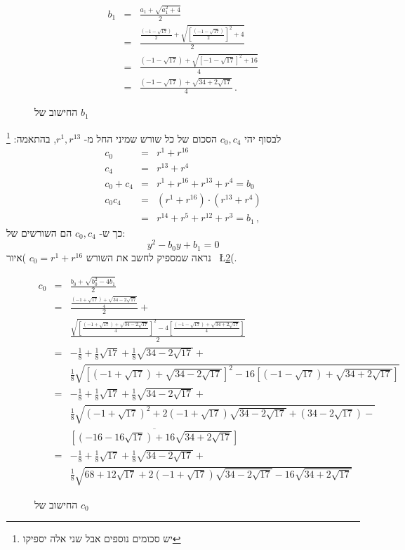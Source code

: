 \documentclass[11pt,a4paper]{article}
\newenvironment{form}[1]{%
\begin{displaymath}%
\renewcommand{\arraystretch}{#1}%
\begin{array}{lcl}}%
{\end{array}%
\end{displaymath}%
}
\newcommand*{\disfrac}[2]{\displaystyle\frac{#1}{#2}}
\begin{document}
\begin{figure}
\begin{form}{2.8}
b_1&=&\disfrac{a_1+\sqrt{a_1^2+4}}{2}\\
&=&\disfrac{
     \disfrac{(-1-\sqrt{17})}{2} + 
     \sqrt{\left[\disfrac{(-1-\sqrt{17})}{2}\right]^2+4}
   }{2}\\
&=&\disfrac{
     (-1-\sqrt{17}) + 
     \sqrt{\left[-1-\sqrt{17}\right]^2+16}
   }{4}\\
&=&\disfrac{
     (-1-\sqrt{17}) + 
     \sqrt{34+2\sqrt{17}}
   }{4}\,.
\end{form}\vspace{-2em}
\caption{החישוב של $b_1$}\label{fig.b1}
\end{figure}
לבסוף יהי
$c_0,c_4$ 
הסכום של כל שורש שמיני החל מ-%
$r^1,r^{13}$,
בהתאמה:%
\footnote{יש סכומים נוספים אבל שני אלה יספיקו}
\begin{form}{1.4}
c_0&=&r^1+r^{16}\\
c_4&=&r^{13}+r^4\\
c_0+c_4&=&r^1+r^{16}+r^{13}+r^4=b_0\\
c_0c_4&=&(r^1+r^{16})\cdot(r^{13}+r^4)\\
&=&r^{14}+r^5+r^{12}+r^3=b_1\,,
\end{form}
כך ש-%
$c_0,c_4$
הם השורשים של:
\[
y^2-b_0y+b_1=0
\]
נראה שמספיק לחשב את השורש
$c_0=r^1+r^{16}$
)איור~
\L{\ref{fig.c0}}(.

\begin{figure}
\begin{form}{2.8}
c_0&=&\disfrac{b_0+\sqrt{b_0^2-4b_1}}{2}\\
&=&\disfrac{
     \disfrac{
     (-1+\sqrt{17}) + 
     \sqrt{34-2\sqrt{17}}
   }{4}}{2} + \\
&& 
    \disfrac{
       \sqrt{\left[\disfrac{
     (-1+\sqrt{17}) + 
     \sqrt{34-2\sqrt{17}}
   }{4}\right]^2-4\left[\disfrac{
     (-1-\sqrt{17}) + 
     \sqrt{34+2\sqrt{17}}
   }{4}\right]}
   }{2}\\
&=&-\disfrac{1}{8}+\disfrac{1}{8}\sqrt{17} + 
     \disfrac{1}{8}\sqrt{34-2\sqrt{17}}
    + \\
   &&
     \disfrac{1}{8}\sqrt{
     \left[
     (-1+\sqrt{17}) + 
     \sqrt{34-2\sqrt{17}}
   \right]^2-16\left[
     (-1-\sqrt{17}) + 
     \sqrt{34+2\sqrt{17}}
   \right]}
\\
&=&-\disfrac{1}{8}+\disfrac{1}{8}\sqrt{17} + 
     \disfrac{1}{8}\sqrt{34-2\sqrt{17}}
    + \\
   &&
     \disfrac{1}{8}\sqrt{
     (-1+\sqrt{17})^2 + 
     2(-1+\sqrt{17})\sqrt{34-2\sqrt{17}}+
     (34-2\sqrt{17})
   -}\\
   &&\overline{
     \left[(-16-16\sqrt{17}) + 
     16\sqrt{34+2\sqrt{17}}\right]
   }
\\
&=&-\disfrac{1}{8}+\disfrac{1}{8}\sqrt{17} + 
     \disfrac{1}{8}\sqrt{34-2\sqrt{17}}
    + \\
   &&
     \disfrac{1}{8}\sqrt{
     68+12\sqrt{17} + 
     2(-1+\sqrt{17})\sqrt{34-2\sqrt{17}}
   -16
     \sqrt{34+2\sqrt{17}}
   }

\end{form}
\caption{החישוב של $c_0$}\label{fig.c0}
\end{figure}
\end{document}

